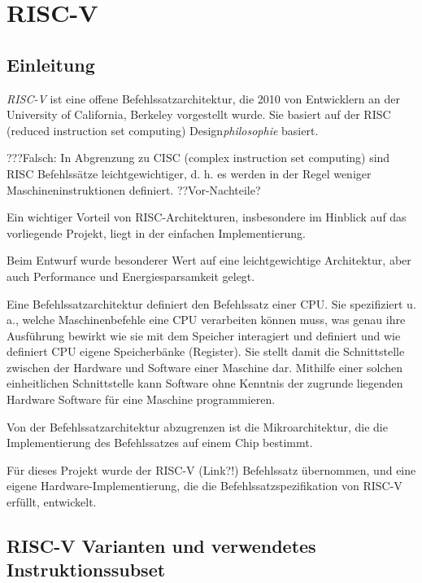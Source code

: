 \chapter{RISC-V} %
\label{RISC-V} %

\section{Einleitung}
\emph{RISC-V} ist eine offene Befehlssatzarchitektur, die 2010 von Entwicklern an der University of California, Berkeley vorgestellt wurde. Sie basiert auf der RISC (reduced instruction set computing) Design\textit{philosophie} basiert. 

???Falsch: In Abgrenzung zu CISC (complex instruction set computing) sind RISC Befehlssätze leichtgewichtiger, d. h. es werden in der Regel weniger Maschineninstruktionen definiert. ??Vor-Nachteile?

Ein wichtiger Vorteil von RISC-Architekturen, insbesondere im Hinblick auf das vorliegende Projekt, liegt in der einfachen Implementierung. 

Beim Entwurf wurde besonderer Wert auf eine leichtgewichtige Architektur, aber auch Performance und Energiesparsamkeit gelegt.

Eine Befehlssatzarchitektur definiert den Befehlssatz einer CPU. Sie spezifiziert u. a., welche Maschinenbefehle eine CPU verarbeiten können muss, was genau ihre Ausführung bewirkt wie sie mit dem Speicher interagiert und definiert und wie definiert CPU eigene Speicherbänke (Register). Sie stellt damit die Schnittstelle zwischen der Hardware und Software einer Maschine dar. Mithilfe einer solchen einheitlichen Schnittstelle kann Software ohne Kenntnis der zugrunde liegenden Hardware Software für eine Maschine programmieren.

Von der Befehlssatzarchitektur abzugrenzen ist die Mikroarchitektur, die die Implementierung des Befehlssatzes auf einem Chip bestimmt.

Für dieses Projekt wurde der RISC-V (Link?!) Befehlssatz übernommen, und eine eigene Hardware-Implementierung, die die Befehlssatzspezifikation von RISC-V erfüllt, entwickelt.


\section{RISC-V Varianten und verwendetes Instruktionssubset}


